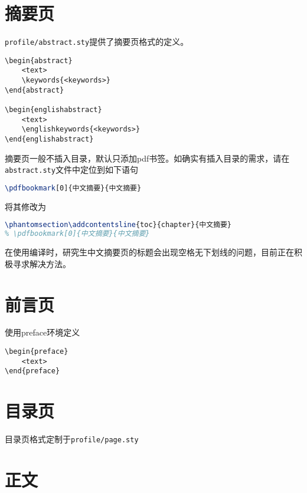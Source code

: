 \section{摘要页}

\texttt{profile/abstract.sty}提供了摘要页格式的定义。

\begin{lstlisting}
\begin{abstract}
    <text>
    \keywords{<keywords>}
\end{abstract}

\begin{englishabstract}
    <text>
    \englishkeywords{<keywords>}
\end{englishabstract}
\end{lstlisting}

摘要页一般不插入目录，默认只添加pdf书签。如确实有插入目录的需求，请在\texttt{abstract.sty}文件中定位到如下语句
\begin{lstlisting}[language=TeX]
% \phantomsection\addcontentsline{toc}{chapter}{中文摘要}
\pdfbookmark[0]{中文摘要}{中文摘要}
\end{lstlisting}
将其修改为
\begin{lstlisting}[language=TeX]
\phantomsection\addcontentsline{toc}{chapter}{中文摘要}
% \pdfbookmark[0]{中文摘要}{中文摘要}
\end{lstlisting}

在使用编译时，研究生中文摘要页的标题会出现空格无下划线的问题，目前正在积极寻求解决方法。

\section{前言页}

使用preface环境定义

\begin{lstlisting}
\begin{preface}
    <text>
\end{preface}
\end{lstlisting}

\section{目录页}

目录页格式定制于\texttt{profile/page.sty}

\section{正文}

